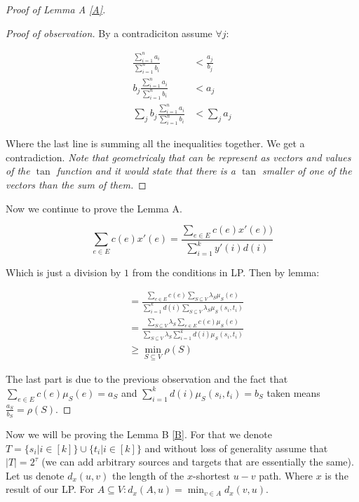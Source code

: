 \begin{proof}[Proof of Lemma A \ref{A}]
	\begin{proof}[Proof of observation]
		By a contradiciton assume $\forall j:$
		
		$$
		\begin{aligned}
			\frac{\sum_{i = 1}^{n} a_{i}}{\sum_{i = 1}^{n} b_{i}} &< \frac{a_{j}}{b_{j}}\\
			b_{j} \frac{\sum_{i = 1}^{n} a_{i}}{\sum_{i = 1}^{n} b_{i}} &< a_{j}\\
			\sum_{j} b_{j} \frac{\sum_{i = 1}^{n} a_{i}}{\sum_{i = 1}^{n} b_{i}} &< \sum_{j} a_{j}
		\end{aligned}
		$$
		
		Where the last line is summing all the inequalities together. We get a contradiction. \textit{Note that geometricaly that can be represent as vectors and values of the $\tan$ function and it would state that there is a $\tan$ smaller of one of the vectors than the sum of them.}
	\end{proof}
	
	Now we continue to prove the Lemma A.
	
	$$
	\sum_{e \in E} c(e) x'(e) = \frac{\sum_{e \in E}c(e) x'(e))}{\sum_{i = 1}^{k}y'(i) d(i)}
	$$
	
	Which is just a division by $1$ from the conditions in LP. Then by lemma:
	
	$$
	\begin{aligned}
		& = \frac{\sum_{e \in E} c(e) \sum_{S \subseteq V} \lambda_{S} \mu_{S}(e)}{\sum_{i =1}^{k} d(i) \sum_{S \subseteq V} \lambda_{S} \mu_{S}(s_{i},t_{i})}\\
		&= \frac{\sum_{S \subseteq V} \lambda_{S} \sum_{e \in E} c(e) \mu_{S}(e)}{\sum_{S \subseteq V} \lambda_{S} \sum_{i =1}^{k} d(i)  \mu_{S}(s_{i},t_{i})}\\
		&\geq \min_{S \subseteq V} \rho(S)
	\end{aligned}
	$$
	
	The last part is due to the previous observation and the fact that $\sum_{e \in E} c(e) \mu_{S}(e) = a_{S}$ and $\sum_{i =1}^{k} d(i)  \mu_{S}(s_{i},t_{i}) = b_{S}$ taken means $\frac{a_{S}}{b_{S}} = \rho(S)$.
\end{proof}

Now we will be proving the Lemma B \ref{B}. For that we denote $T = \{s_{i} | i \in [k]\} \cup \{t_{i}| i \in [k]\}$ and without loss of generality assume that $|T| = 2^{\tau}$ (we can add arbitrary sources and targets that are essentially the same). Let us denote $d_{x} (u,v)$ the length of the $x$-shortest $u-v$ path. Where $x$ is the result of our LP. For $A \subseteq V: d_{x}(A,u) = \min_{v \in A} d_{x}(v,u)$.

